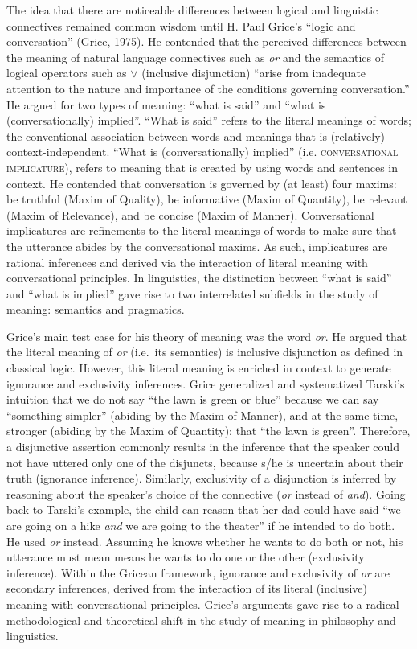 \documentclass[floatsintext,man]{apa6}
\theoremstyle{definition}
\theoremstyle{definition}
\theoremstyle{definition}
\theoremstyle{remark}
\begin{document}
The idea that there are noticeable differences between logical and
linguistic connectives remained common wisdom until H. Paul Grice's
\enquote{logic and conversation} (Grice, 1975). He contended that the
perceived differences between the meaning of natural language
connectives such as \emph{or} and the semantics of logical operators
such as \(\vee\) (inclusive disjunction) \enquote{arise from inadequate
attention to the nature and importance of the conditions governing
conversation.} He argued for two types of meaning: \enquote{what is
said} and \enquote{what is (conversationally) implied}. \enquote{What is
said} refers to the literal meanings of words; the conventional
association between words and meanings that is (relatively)
context-independent. \enquote{What is (conversationally) implied} (i.e.
\textsc{conversational implicature}), refers to meaning that is created
by using words and sentences in context. He contended that conversation
is governed by (at least) four maxims: be truthful (Maxim of Quality),
be informative (Maxim of Quantity), be relevant (Maxim of Relevance),
and be concise (Maxim of Manner). Conversational implicatures are
refinements to the literal meanings of words to make sure that the
utterance abides by the conversational maxims. As such, implicatures are
rational inferences and derived via the interaction of literal meaning
with conversational principles. In linguistics, the distinction between
\enquote{what is said} and \enquote{what is implied} gave rise to two
interrelated subfields in the study of meaning: semantics and
pragmatics.

Grice's main test case for his theory of meaning was the word \emph{or}.
He argued that the literal meaning of \emph{or} (i.e.~its semantics) is
inclusive disjunction as defined in classical logic. However, this
literal meaning is enriched in context to generate ignorance and
exclusivity inferences. Grice generalized and systematized Tarski's
intuition that we do not say \enquote{the lawn is green or blue} because
we can say \enquote{something simpler} (abiding by the Maxim of Manner),
and at the same time, stronger (abiding by the Maxim of Quantity): that
\enquote{the lawn is green}. Therefore, a disjunctive assertion commonly
results in the inference that the speaker could not have uttered only
one of the disjuncts, because s/he is uncertain about their truth
(ignorance inference). Similarly, exclusivity of a disjunction is
inferred by reasoning about the speaker's choice of the connective
(\emph{or} instead of \emph{and}). Going back to Tarski's example, the
child can reason that her dad could have said \enquote{we are going on a
hike \emph{and} we are going to the theater} if he intended to do both.
He used \emph{or} instead. Assuming he knows whether he wants to do both
or not, his utterance must mean means he wants to do one or the other
(exclusivity inference). Within the Gricean framework, ignorance and
exclusivity of \emph{or} are secondary inferences, derived from the
interaction of its literal (inclusive) meaning with conversational
principles. Grice's arguments gave rise to a radical methodological and
theoretical shift in the study of meaning in philosophy and linguistics.
\end{document}
